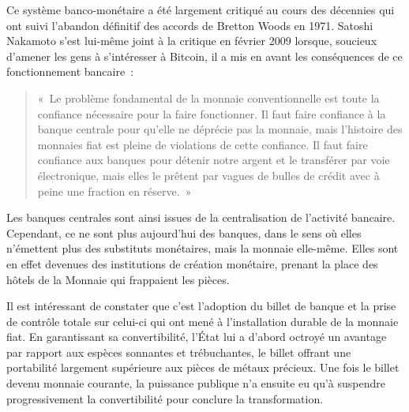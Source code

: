 Ce système banco-monétaire a été largement critiqué au cours des décennies qui ont suivi l'abandon définitif des accords de Bretton Woods en 1971. Satoshi Nakamoto s'est lui-même joint à la critique en février 2009 lorsque, soucieux d'amener les gens à s'intéresser à Bitcoin, il a mis en avant les conséquences de ce fonctionnement bancaire~:

\begin{quote}
«~Le problème fondamental de la monnaie conventionnelle est toute la confiance nécessaire pour la faire fonctionner. Il faut faire confiance à la banque centrale pour qu'elle ne déprécie pas la monnaie, mais l'histoire des monnaies fiat est pleine de violations de cette confiance. Il faut faire confiance aux banques pour détenir notre argent et le transférer par voie électronique, mais elles le prêtent par vagues de bulles de crédit avec à peine une fraction en réserve.~»
\end{quote} %


Les banques centrales sont ainsi issues de la centralisation de l'activité bancaire. Cependant, ce ne sont plus aujourd'hui des banques, dans le sens où elles n'émettent plus des substituts monétaires, mais la monnaie elle-même. Elles sont en effet devenues des institutions de création monétaire, prenant la place des hôtels de la Monnaie qui frappaient les pièces.

Il est intéressant de constater que c'est l'adoption du billet de banque et la prise de contrôle totale sur celui-ci qui ont mené à l'installation durable de la monnaie fiat. En garantissant sa convertibilité, l'État lui a d'abord octroyé un avantage par rapport aux espèces sonnantes et trébuchantes, le billet offrant une portabilité largement supérieure aux pièces de métaux précieux. Une fois le billet devenu monnaie courante, la puissance publique n'a ensuite eu qu'à suspendre progressivement la convertibilité pour conclure la transformation.

